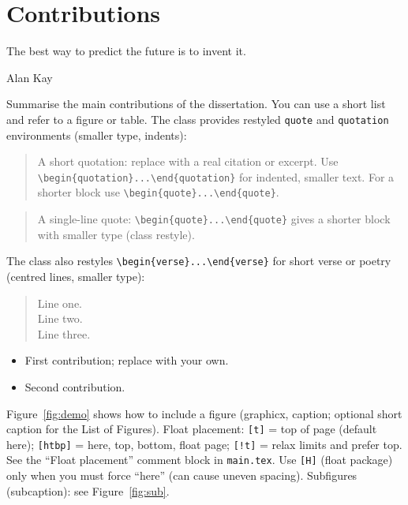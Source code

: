 \section{Contributions}\label{sec:contributions}

\epigraph{The best way to predict the future is to invent it.}{Alan Kay}

Summarise the main contributions of the dissertation. You can use a short list and refer to a figure or table. The class provides restyled \texttt{quote} and \texttt{quotation} environments (smaller type, indents):

\begin{quotation}
  A short quotation: replace with a real citation or excerpt. Use \verb|\begin{quotation}...\end{quotation}| for indented, smaller text. For a shorter block use \verb|\begin{quote}...\end{quote}|.
\end{quotation}

\begin{quote}
  A single-line quote: \verb|\begin{quote}...\end{quote}| gives a shorter block with smaller type (class restyle).
\end{quote}

The class also restyles \verb|\begin{verse}...\end{verse}| for short verse or poetry (centred lines, smaller type):
\begin{verse}
  Line one.\\
  Line two.\\
  Line three.
\end{verse}

\begin{itemize}
  \item First contribution; replace with your own.
  \item Second contribution.
\end{itemize}

Figure~\ref{fig:demo} shows how to include a figure (graphicx, caption; optional short caption for the List of Figures). Float placement: \texttt{[t]} = top of page (default here); \texttt{[htbp]} = here, top, bottom, float page; \texttt{[!t]} = relax limits and prefer top. See the ``Float placement'' comment block in \texttt{main.tex}. Use \texttt{[H]} (float package) only when you must force ``here'' (can cause uneven spacing). Subfigures (subcaption): see Figure~\ref{fig:sub}.

